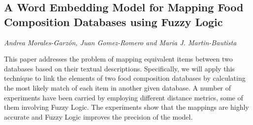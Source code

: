 \documentclass[../booklet.tex]{subfiles}
\begin{document}
\subsection[A Word Embedding Model for Mapping Food Composition Databases using Fuzzy Logic. {\it Andrea Morales-Garzón, Juan Gomez-Romero and Maria J. Martin-Bautista}]{A Word Embedding Model for Mapping Food Composition Databases using Fuzzy Logic}
  

\begin{center}
  {\it Andrea Morales-Garzón, Juan Gomez-Romero and Maria J. Martin-Bautista}
\end{center}

\vskip 0.8cm





This paper addresses the problem of mapping equivalent items between two databases based on their textual descriptions. Specifically, we will apply this technique to link the elements of two food composition databases by calculating the most likely match of each item in another given database. A number of experiments have been carried by employing different distance metrics, some of them involving Fuzzy Logic. The experiments show that the mappings are highly accurate and Fuzzy Logic improves the precision of the model.%


\end{document}
